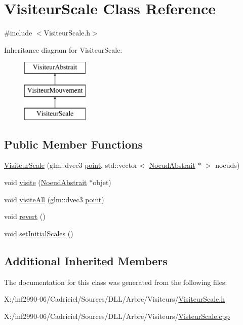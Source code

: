 \hypertarget{class_visiteur_scale}{\section{Visiteur\-Scale Class Reference}
\label{class_visiteur_scale}
}


{\ttfamily \#include $<$Visiteur\-Scale.\-h$>$}

Inheritance diagram for Visiteur\-Scale\-:\begin{figure}[H]
\begin{center}
\leavevmode
\includegraphics[height=3.000000cm]{class_visiteur_scale}
\end{center}
\end{figure}
\subsection*{Public Member Functions}
\begin{DoxyCompactItemize}
\item 
\hyperlink{group__inf2990_ga50f3f06ba71a97767a991dd380d51b82}{Visiteur\-Scale} (glm\-::dvec3 \hyperlink{group__inf2990_ga8a44174e0b3838fd7371a5056d3be30f}{point}, std\-::vector$<$ \hyperlink{class_noeud_abstrait}{Noeud\-Abstrait} $\ast$ $>$ noeuds)
\item 
void \hyperlink{group__inf2990_ga1e67b44c836b2afcc46d4b8006bc6cb9}{visite} (\hyperlink{class_noeud_abstrait}{Noeud\-Abstrait} $\ast$objet)
\item 
void \hyperlink{group__inf2990_ga44e14cceb2ebe66eae8c93cb5305689c}{visite\-All} (glm\-::dvec3 \hyperlink{group__inf2990_ga8a44174e0b3838fd7371a5056d3be30f}{point})
\item 
void \hyperlink{group__inf2990_ga0ec18c999196298a1bb8b8002aae3c24}{revert} ()
\item 
void \hyperlink{group__inf2990_gafbd7792d148a3bc2d848a46e4dee2187}{set\-Initial\-Scales} ()
\end{DoxyCompactItemize}
\subsection*{Additional Inherited Members}


The documentation for this class was generated from the following files\-:\begin{DoxyCompactItemize}
\item 
X\-:/inf2990-\/06/\-Cadriciel/\-Sources/\-D\-L\-L/\-Arbre/\-Visiteurs/\hyperlink{_visiteur_scale_8h}{Visiteur\-Scale.\-h}\item 
X\-:/inf2990-\/06/\-Cadriciel/\-Sources/\-D\-L\-L/\-Arbre/\-Visiteurs/\hyperlink{_visteur_scale_8cpp}{Visteur\-Scale.\-cpp}\end{DoxyCompactItemize}
